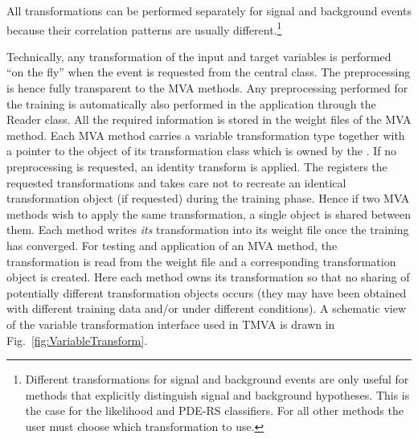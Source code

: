 All transformations can be performed separately for signal and background events
because their correlation patterns are usually different.\footnote
{
   Different transformations for signal and background events are only 
   useful for methods that explicitly distinguish signal and background 
   hypotheses. This is the case for the likelihood and PDE-RS classifiers.
   For all other methods the user must choose which transformation to use.
}

Technically, any transformation of the input and target variables is performed ``on the fly'' 
when the event is requested from the central  class. The preprocessing 
is hence fully transparent to the MVA methods. Any preprocessing performed for the 
training is automatically also performed in the application through the Reader class. 
All the required information is stored in the weight files of the MVA method.
Each MVA method carries a variable
transformation type together with a pointer to the object of its
transformation class which is owned by the . If no
preprocessing is requested, an identity transform is applied. The
 registers the requested transformations and takes care
not to recreate an identical transformation object (if requested)
during the training phase. Hence if two MVA methods wish to apply the
same transformation, a single object is shared between them. Each
method writes {\em its} transformation into its weight file once
the training has converged. For testing and application of an
MVA method, the transformation is read from the weight file and a
corresponding transformation object is created. Here each method
owns its transformation so that no sharing of potentially different
transformation objects occurs (they may have been obtained with
different training data and/or under different conditions). A
schematic view of the variable transformation interface used in TMVA
is drawn in Fig.~\ref{fig:VariableTransform}.
